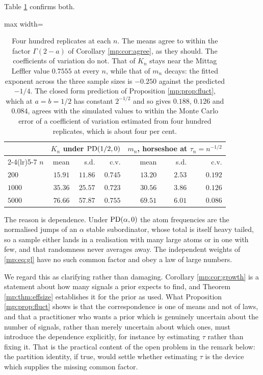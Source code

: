 Table \ref{mp:tab:fluct} confirms both.

\begin{table}[t]
\centering
\begin{adjustbox}{max width=\textwidth}
\begin{tabular}{lrrrrrr}
\toprule
& \multicolumn{3}{c}{$K_n$ under $\mathrm{PD}(1/2,0)$} & \multicolumn{3}{c}{$m_n$, horseshoe at $\tau_n=n^{-1/2}$} \\
\cmidrule(lr){2-4}\cmidrule(lr){5-7}
$n$ & mean & s.d. & c.v. & mean & s.d. & c.v. \\
\midrule
$200$   & $15.91$ & $11.86$ & $0.745$ & $13.20$ & $2.53$ & $0.192$ \\
$1000$  & $35.36$ & $25.57$ & $0.723$ & $30.56$ & $3.86$ & $0.126$ \\
$5000$  & $76.66$ & $57.87$ & $0.755$ & $69.51$ & $6.01$ & $0.086$ \\
\bottomrule
\end{tabular}
\end{adjustbox}
\caption{Four hundred replicates at each $n$. The means agree to within the factor
$\Gamma(2-a)$ of Corollary \ref{mp:cor:agree}, as they should. The coefficients of variation do
not. That of $K_n$ stays near the Mittag Leffler value $0.7555$ at every $n$, while that of
$m_n$ decays: the fitted exponent across the three sample sizes is $-0.250$ against the
predicted $-1/4$. The closed form prediction of Proposition \ref{mp:prop:fluct}, which at $a=b=1/2$ has constant
$2^{-1/2}$ and so gives $0.188$, $0.126$ and $0.084$, agrees with the simulated values to within the Monte Carlo error of a coefficient of variation estimated from four
hundred replicates, which is about four per cent.}
\label{mp:tab:fluct}
\end{table}

The reason is dependence. Under $\mathrm{PD}(\alpha,0)$ the atom frequencies are the normalised jumps
of an $\alpha$ stable subordinator, whose total is itself heavy tailed, so a sample either
lands in a realisation with many large atoms or in one with few, and that randomness never
averages away. The independent weights of \eqref{mp:eq:gl} have no such common factor and obey
a law of large numbers.

We regard this as clarifying rather than damaging. Corollary \ref{mp:cor:growth} is a statement
about how many signals a prior expects to find, and Theorem \ref{mp:thm:effsize} establishes it
for the prior as used. What Proposition \ref{mp:prop:fluct} shows is that the correspondence is
one of means and not of laws, and that a practitioner who wants a prior which is genuinely
uncertain about the number of signals, rather than merely uncertain about which ones, must
introduce the dependence explicitly, for instance by estimating $\tau$ rather than fixing it.
That is the practical content of the open problem in the remark below: the partition identity,
if true, would settle whether estimating $\tau$ is the device which supplies the missing
common factor.

